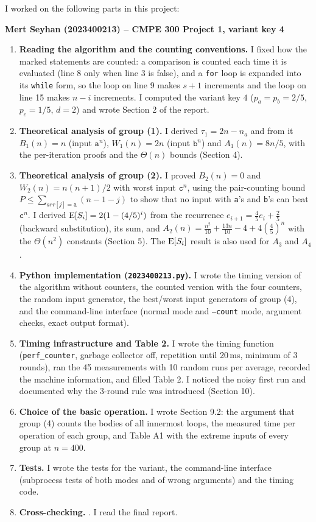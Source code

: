 

\draftbanner
I worked on the following parts in this project:

\textbf{Mert Seyhan (2023400213) -- CMPE 300 Project 1, variant key 4}

\begin{enumerate}[leftmargin=1.5em]
\item \textbf{Reading the algorithm and the counting conventions.} I fixed how the marked statements are counted:
a comparison is counted each time it is evaluated (line 8 only when line 3 is false), and a \texttt{for} loop is
expanded into its \texttt{while} form, so the loop on line 9 makes $s+1$ increments and the loop on line 15 makes
$n-i$ increments. I computed the variant key $4$ ($p_a=p_b=2/5$, $p_c=1/5$, $d=2$) and wrote Section 2 of the report.
\item \textbf{Theoretical analysis of group (1).} I derived $\tau_1=2n-n_a$ and from it $B_1(n)=n$ (input
$\texttt{a}^n$), $W_1(n)=2n$ (input $\texttt{b}^n$) and $A_1(n)=8n/5$, with the per-iteration proofs and the
$\Theta(n)$ bounds (Section 4).
\item \textbf{Theoretical analysis of group (2).} I proved $B_2(n)=0$ and $W_2(n)=n(n+1)/2$ with worst input
$\texttt{c}^n$, using the pair-counting bound $P\le\sum_{arr[j]=\texttt{a}}(n-1-j)$ to show that no input with
\texttt{a}'s and \texttt{b}'s can beat $\texttt{c}^n$. I derived $\mathrm{E}[S_i]=2(1-(4/5)^i)$ from the recurrence
$e_{i+1}=\frac45e_i+\frac25$ (backward substitution), its sum, and $A_2(n)=\frac{n^2}{10}+\frac{13n}{10}-4+4(\frac45)^n$
with the $\Theta(n^2)$ constants (Section 5). The $\mathrm{E}[S_i]$ result is also used for $A_3$ and $A_4$.
\item \textbf{Python implementation (\texttt{2023400213.py}).} I wrote the timing version of the algorithm without
counters, the counted version with the four counters, the random input generator, the best/worst input generators of
group (4), and the command-line interface (normal mode and \texttt{--count} mode, argument checks, exact output
format).
\item \textbf{Timing infrastructure and Table 2.} I wrote the timing function (\texttt{perf\_counter}, garbage
collector off, repetition until 20\,ms, minimum of 3 rounds), ran the 45 measurements with 10 random runs per average,
recorded the machine information, and filled Table 2. I noticed the noisy first run and documented why the 3-round
rule was introduced (Section 10).
\item \textbf{Choice of the basic operation.} I wrote Section 9.2: the argument that group (4) counts the bodies of
all innermost loops, the measured time per operation of each group, and Table A1 with the extreme inputs of every
group at $n=400$.
\item \textbf{Tests.} I wrote the tests for the variant, the command-line interface (subprocess tests of both modes and
of wrong arguments) and the timing code.
\item \textbf{Cross-checking.} . I read the final report.
\end{enumerate}

